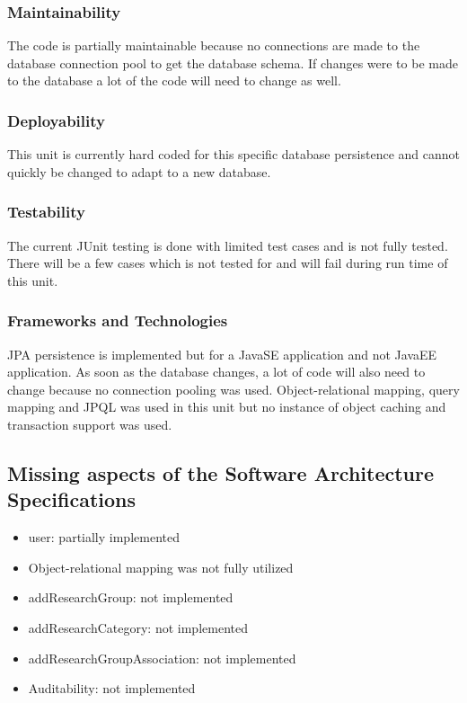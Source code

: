 \documentclass{article}
\begin{document}
	\subsubsection{Maintainability}
	The code is partially maintainable because no connections are made to the database connection pool to get the database schema. If changes were to be made to the database a lot of the code will need to change as well.
	
	\subsubsection{Deployability}
	This unit is currently hard coded for this specific database persistence and cannot quickly be changed to adapt to a new database.
	
	\subsubsection{Testability}
	The current JUnit testing is done with limited test cases and is not fully tested. There will be a few cases which is not tested for and will fail during run time of this unit.
	
	\subsubsection{Frameworks and Technologies}
	JPA persistence is implemented but for a JavaSE application and not JavaEE application. As soon as the database changes, a lot of code will also need to change because no connection pooling was used. Object-relational mapping, query mapping and JPQL was used in this unit but no instance of object caching and transaction support was used.
	
	\subsection{Missing aspects of the Software Architecture Specifications}
	\begin{itemize}
		\item user: partially implemented
		\item Object-relational mapping was not fully utilized
		\item addResearchGroup: not implemented
		\item addResearchCategory: not implemented
		\item addResearchGroupAssociation: not implemented
		\item Auditability: not implemented
	\end{itemize}
	
\end{document}
